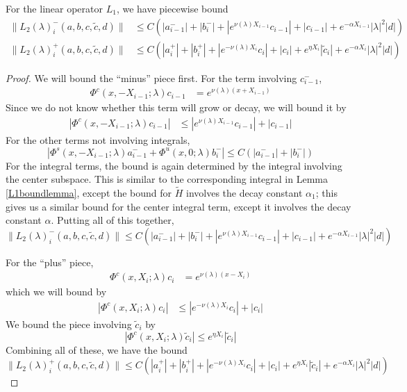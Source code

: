 \documentclass[thesis.tex]{subfiles}
\begin{document}
\begin{lemma}\label{L2boundlemma}
For the linear operator $L_1$, we have piecewise bound
\begin{equation}\label{L2bound}
\begin{aligned}
\| L_2(\lambda)_i^-(a,b,c,\tilde{c},d) \| &\leq C(|a_{i-1}^-| + |b_i^-| + |e^{\nu(\lambda)X_{i-1}}c_{i-1}| + |c_{i-1}| + e^{-\alpha X_{i-1}}|\lambda|^2|d|)\\
\| L_2(\lambda)_i^+(a,b,c,\tilde{c},d) \| &\leq C(|a_i^+| + |b_i^+| + |e^{-\nu(\lambda)X_i} c_i| + |c_i| + e^{\eta X_i}|\tilde{c}_i| + e^{-\alpha X_i}|\lambda|^2|d|)
\end{aligned}
\end{equation}
\begin{proof}
We will bound the ``minus'' piece first. For the term involving $c_{i-1}^-$, 
\begin{align*}
\Phi^c(x, -X_{i-1}; \lambda) c_{i-1}
&= e^{\nu(\lambda)(x + X_{i-1})}
\end{align*}
Since we do not know whether this term will grow or decay, we will bound it by
\begin{align*}
|\Phi^c(x, -X_{i-1}; \lambda) c_{i-1}|
&\leq |e^{\nu(\lambda)X_{i-1}}c_{i-1}| + |c_{i-1}|
\end{align*}
For the other terms not involving integrals,
\[
\left| \Phi^s(x, -X_{i-1}; \lambda) a_{i-1}^- + \Phi^u(x, 0; \lambda) b_i^- \right| \leq C(|a_{i-1}^-| + |b_i^-|)
\]
For the integral terms, the bound is again determined by the integral involving the center subspace. This is similar to the corresponding integral in Lemma \ref{L1boundlemma}, except the bound for $\tilde{H}$ involves the decay constant $\alpha_1$; this gives us a similar bound for the center integral term, except it involves the decay constant $\alpha$. Putting all of this together,
\[
\| L_2(\lambda)_i^-(a,b,c,\tilde{c},d) \| \leq C(|a_{i-1}^-| + |b_i^-| + |e^{\nu(\lambda)X_{i-1}}c_{i-1}| + |c_{i-1}| + e^{-\alpha X_{i-1}}|\lambda|^2|d|)
\]

For the ``plus'' piece, 
\begin{align*}
\Phi^c(x, X_i; \lambda) c_i
&= e^{\nu(\lambda)(x - X_i)}
\end{align*}
which we will bound by 
\begin{align*}
|\Phi^c(x, X_i; \lambda) c_i|
&\leq |e^{-\nu(\lambda)X_i}c_i| + |c_i|
\end{align*}
We bound the piece involving $\tilde{c}_i$ by
\[
|\Phi^c(x, X_i; \lambda) \tilde{c}_i|
\leq e^{\eta X_i}|\tilde{c}_i|
\]
Combining all of these, we have the bound
\[
\| L_2(\lambda)_i^+(a,b,c,\tilde{c},d) \| \leq C(|a_i^+| + |b_i^+| + |e^{-\nu(\lambda)X_i} c_i| + |c_i| + e^{\eta X_i}|\tilde{c}_i| + e^{-\alpha X_i}|\lambda|^2|d|)
\]
\end{proof}
\end{lemma}
\end{document}
